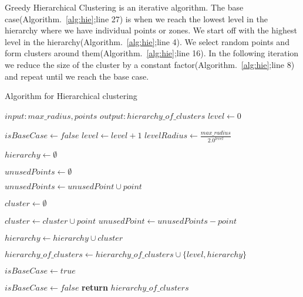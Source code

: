 Greedy Hierarchical Clustering is an iterative algorithm. The base case(Algorithm.~\ref{alg:hie};line 27) is when we reach the lowest level in the hierarchy where we have individual points or zones. We start off with the highest level in the hierarchy(Algorithm.~\ref{alg:hie};line 4). We select random points and form clusters around them(Algorithm.~\ref{alg:hie};line 16). In the following iteration we reduce the size of the cluster by a constant factor(Algorithm.~\ref{alg:hie};line 8) and repeat until we reach the base case.


\begin{algorithm}
\caption{Algorithm for Hierarchical clustering}\label{alg:hie}
\begin{algorithmic}[1]
  	\State $input: max\_radius, points$
      \State $output: hierarchy\_of\_clusters$
   	\State $level \gets 0$

  	\State $isBaseCase \gets false$
  	    \State $level \gets level + 1$
  	    \State $levelRadius \gets \frac{max\_radius}{2.0^{level}}$

  	 	\State $hierarchy \gets \emptyset$

  	    \State $unusedPoints \gets \emptyset$

      		\State $unusedPoints \gets unusedPoint \cup point$
      	\EndFor

  			\State $cluster \gets \emptyset$


  					\State $cluster \gets cluster \cup point$
  					\State $unusedPoint \gets unusedPoints - point$
                 \EndIf
  			\EndFor

  			\State $hierarchy \gets hierarchy \cup cluster$

      	\EndWhile
    \end{algorithmic}
    \end{algorithm}
    \begin{algorithm}
    \begin{algorithmic} [1]
      	\State $hierarchy\_of\_clusters \gets hierarchy\_of\_clusters \cup \{level,hierarchy\}$

      	\State $isBaseCase \gets true$

  				\State $isBaseCase \gets false$
  			\EndIf
  		\EndFor
  	\EndWhile
  	\State \textbf{return} $hierarchy\_of\_clusters$

\EndProcedure
\end{algorithmic}
\end{algorithm}


